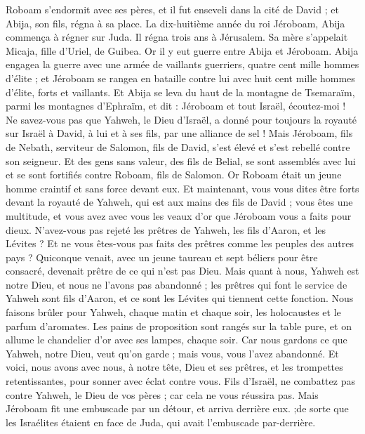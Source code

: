 \begin{multicols}{2}
Roboam s'endormit avec ses pères, et il fut enseveli dans la cité de David ; et Abija, son fils, régna à sa place.
\VerseOne{}La dix-huitième année du roi Jéroboam, Abija commença à régner sur Juda.
Il régna trois ans à Jérusalem. Sa mère s'appelait Micaja, fille d'Uriel, de Guibea. Or il y eut guerre entre Abija et Jéroboam.
Abija engagea la guerre avec une armée de vaillants guerriers, quatre cent mille hommes d'élite ; et Jéroboam se rangea en bataille contre lui avec huit cent mille hommes d'élite, forts et vaillants.
Et Abija se leva du haut de la montagne de Tsemaraïm, parmi les montagnes d'Ephraïm, et dit : Jéroboam et tout Israël, écoutez-moi !
Ne savez-vous pas que Yahweh, le Dieu d'Israël, a donné pour toujours la royauté sur Israël à David, à lui et à ses fils, par une alliance de sel !
Mais Jéroboam, fils de Nebath, serviteur de Salomon, fils de David, s'est élevé et s'est rebellé contre son seigneur.
Et des gens sans valeur, des fils de Belial, se sont assemblés avec lui et se sont fortifiés contre Roboam, fils de Salomon. Or Roboam était un jeune homme craintif et sans force devant eux.
Et maintenant, vous vous dites être forts devant la royauté de Yahweh, qui est aux mains des fils de David ; vous êtes une multitude, et vous avez avec vous les veaux d'or que Jéroboam vous a faits pour dieux.
N'avez-vous pas rejeté les prêtres de Yahweh, les fils d'Aaron, et les Lévites ? Et ne vous êtes-vous pas faits des prêtres comme les peuples des autres pays ? Quiconque venait, avec un jeune taureau et sept béliers pour être consacré, devenait prêtre de ce qui n'est pas Dieu.
Mais quant à nous, Yahweh est notre Dieu, et nous ne l'avons pas abandonné ; les prêtres qui font le service de Yahweh sont fils d'Aaron, et ce sont les Lévites qui tiennent cette fonction.
Nous faisons brûler pour Yahweh, chaque matin et chaque soir, les holocaustes et le parfum d'aromates. Les pains de proposition sont rangés sur la table pure, et on allume le chandelier d'or avec ses lampes, chaque soir. Car nous gardons ce que Yahweh, notre Dieu, veut qu'on garde ; mais vous, vous l'avez abandonné.
Et voici, nous avons avec nous, à notre tête, Dieu et ses prêtres, et les trompettes retentissantes, pour sonner avec éclat contre vous. Fils d'Israël, ne combattez pas contre Yahweh, le Dieu de vos pères ; car cela ne vous réussira pas.
Mais Jéroboam fit une embuscade par un détour, et arriva derrière eux. ;de sorte que les Israélites étaient en face de Juda, qui avait l'embuscade par-derrière.

\end{multicols}
